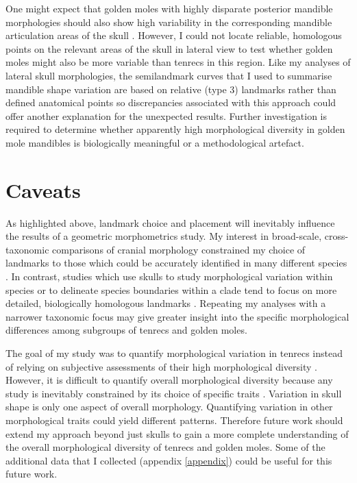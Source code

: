 	One might expect that golden moles with highly disparate posterior mandible morphologies should also show high variability in the corresponding mandible articulation areas of the skull \citep[although developmental genetics studies have revealed that mandibles can develop shape variation independently of skulls, ][] {Rot-Nikcevic2007}. However, I could not locate reliable, homologous points on the relevant areas of the skull in lateral view to test whether golden moles might also be more variable than tenrecs in this region. Like my analyses of lateral skull morphologies, the semilandmark curves that I used to summarise mandible shape variation are based on relative (type 3) landmarks rather than defined anatomical points \citep{Zelditch2012} so discrepancies associated with this approach could offer another explanation for the unexpected results. Further investigation is required to determine whether apparently high morphological diversity in golden mole mandibles is biologically meaningful or a methodological artefact. 

	
	
\section{Caveats}

	As highlighted above, landmark choice and placement will inevitably influence the results of a geometric morphometrics study. My interest in broad-scale, cross-taxonomic comparisons of cranial morphology constrained my choice of landmarks to those which could be accurately identified in many different species \citep[e.g.][]{Ruta2013, Goswami2011, Wroe2007}. In contrast, studies which use skulls to study morphological variation within species \citep{Blagojevic2011, Bornholdt2008} or to delineate species boundaries within a clade \citep[e.g.][]{Panchetti2008} tend to focus on more detailed, biologically homologous landmarks \citep{Zelditch2012}. Repeating my analyses with a narrower taxonomic focus may give greater insight into the specific morphological differences among subgroups of tenrecs and golden moles.
	
	The goal of my study was to quantify morphological variation in tenrecs instead of relying on subjective assessments of their high morphological diversity \citep{Olson2013, Soarimalala2011, Eisenberg1969}. However, it is difficult to quantify overall morphological diversity because any study is inevitably constrained by its choice of specific traits \citep{Roy1997}. Variation in skull shape is only one aspect of overall morphology. Quantifying variation in other morphological traits could yield different patterns. Therefore future work should extend my approach beyond just skulls to gain a more complete understanding of the overall morphological diversity of tenrecs and golden moles. Some of the additional data that I collected (appendix \ref{appendix}) could be useful for this future work.



